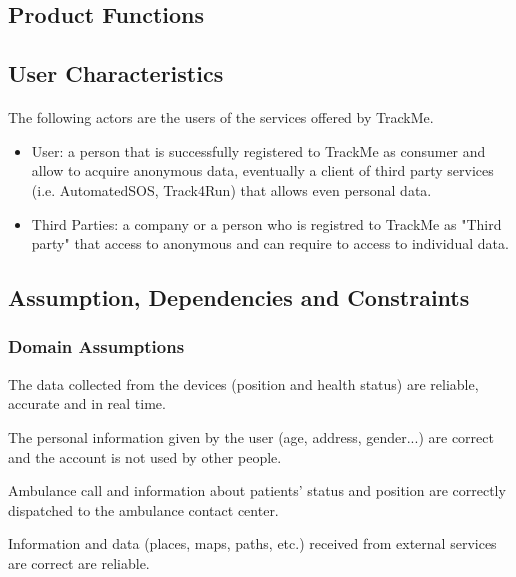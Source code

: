 \documentclass[a4paper]{article}
\begin{document}
    
    \subsection{Product Functions}
    
    \subsection{User Characteristics}
    
    \paragraph{}The following actors are the users of the services offered by TrackMe. 
    
    
    \begin{itemize}
        \item User:  a person that is successfully registered to TrackMe as consumer and allow to acquire anonymous data, eventually a client of third party services (i.e. AutomatedSOS, Track4Run) that allows even personal data.
        
        \item Third Parties:  a company or a person who is registred to TrackMe as "Third party" that access to anonymous and can require to access to individual data.
        
    \end{itemize}
    
    \subsection{Assumption, Dependencies and Constraints}
    
    \subsubsection{Domain Assumptions}
    
    
    \begin{enumerate}[label={[D.\arabic*]}]
        
        \item The data collected from the devices (position and health status) are reliable, accurate and in real time.
        \item The personal information given by the user (age, address, gender...) are correct and the account is not used by other people. 
        \item Ambulance call and information about patients' status and position are correctly dispatched to the ambulance contact center.
        \item Information and data (places, maps, paths, etc.) received from external services are correct are reliable.
        
    \end{enumerate}
    
\end{document}
